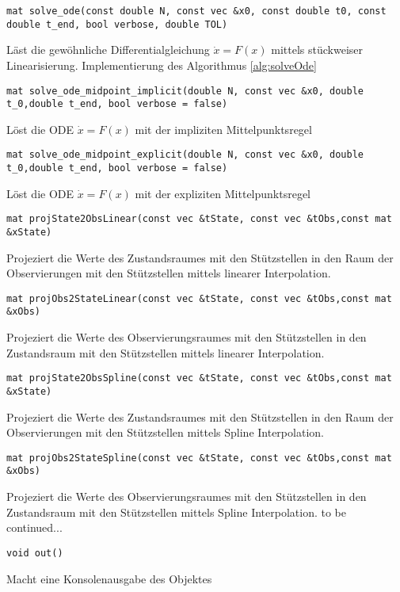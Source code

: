 \begin{lstlisting}[numbers=none]
mat solve_ode(const double N, const vec &x0, const double t0, const double t_end, bool verbose, double TOL)
\end{lstlisting}
Läst die gewöhnliche Differentialgleichung  $\dot x = F(x)$ mittels stückweiser Linearisierung. Implementierung des Algorithmus \ref{alg:solveOde}
\begin{lstlisting}[numbers=none]
mat solve_ode_midpoint_implicit(double N, const vec &x0, double t_0,double t_end, bool verbose = false)
\end{lstlisting}
Löst die ODE  $\dot x = F(x)$ mit der impliziten Mittelpunktsregel
\begin{lstlisting}[numbers=none]
mat solve_ode_midpoint_explicit(double N, const vec &x0, double t_0,double t_end, bool verbose = false)
\end{lstlisting}
Löst die ODE  $\dot x = F(x)$ mit der expliziten Mittelpunktsregel
\begin{lstlisting}[numbers=none]
mat projState2ObsLinear(const vec &tState, const vec &tObs,const mat &xState)
\end{lstlisting}
Projeziert die Werte  des Zustandsraumes mit den Stützstellen  in den Raum der Observierungen mit den Stützstellen  mittels linearer Interpolation.
\begin{lstlisting}[numbers=none]
mat projObs2StateLinear(const vec &tState, const vec &tObs,const mat &xObs)
\end{lstlisting}
Projeziert die Werte  des Observierungsraumes mit den Stützstellen  in den Zustandsraum mit den Stützstellen  mittels linearer Interpolation.
\begin{lstlisting}[numbers=none]
mat projState2ObsSpline(const vec &tState, const vec &tObs,const mat &xState)
\end{lstlisting}
Projeziert die Werte  des Zustandsraumes mit den Stützstellen  in den Raum der Observierungen mit den Stützstellen  mittels Spline Interpolation.
\begin{lstlisting}[numbers=none]
mat projObs2StateSpline(const vec &tState, const vec &tObs,const mat &xObs)
\end{lstlisting}
Projeziert die Werte  des Observierungsraumes mit den Stützstellen  in den Zustandsraum mit den Stützstellen  mittels Spline Interpolation.
to be continued...
\begin{lstlisting}[numbers=none]
void out()
\end{lstlisting}
Macht eine Konsolenausgabe des  Objektes
